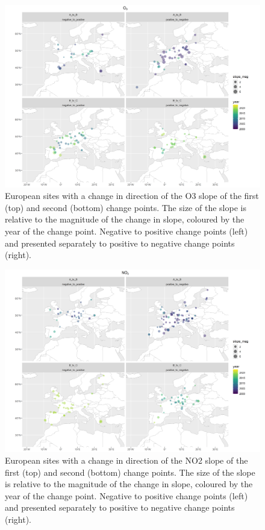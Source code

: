 \documentclass[journal abbreviation, manuscript]{copernicus}
\begin{document}
\begin{figure}[t]
\includegraphics[width=12cm]{plots/EU_o3_tau_0.5_changepoint_year_mag_map.png}
\caption{European sites with a change in direction of the O3 slope of the first (top) and second (bottom) change points. The size of the slope is relative to the magnitude of the change in slope, coloured by the year of the change point. Negative to positive change points (left) and presented separately to positive to negative change points (right).}
\label{eu_o3_changepoint_map}
\end{figure}

\begin{figure}[t]
\includegraphics[width=12cm]{plots/EU_no2_tau_0.5_changepoint_year_mag_map.png}
\caption{European sites with a change in direction of the NO2 slope of the first (top) and second (bottom) change points. The size of the slope is relative to the magnitude of the change in slope, coloured by the year of the change point. Negative to positive change points (left) and presented separately to positive to negative change points (right).}
\label{eu_no2_changepoint_map}
\end{figure}
\end{document}
